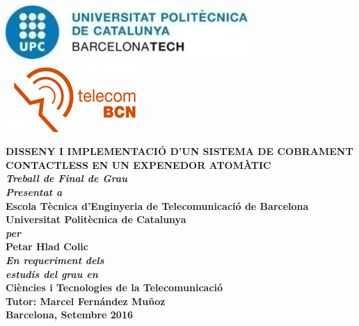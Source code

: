 \documentclass[12pt,a4paper,twoside,openright]{book}
\begin{document}
\newcommand{\titol}{Disseny i implementació d'un sistema de cobrament contactless en un expenedor atomàtic}
\newcommand{\shortitol}{Short title}
\newcommand{\autor}{Petar Hlad Colic}
\renewcommand{\cleardoublepage}{}

\frontmatter
\begin{titlepage}
   	\includegraphics[scale=1]{images/logoUPC.jpg}
   	\hfill
   	\includegraphics[scale=1]{images/logoETSETB.jpg}\\

   	\begin{center}
   	\vspace{1em}
   	\LARGE\textbf{\MakeUppercase{\titol}} \\
   	\vspace{2em}
   	\large\textit{\textbf{Treball de Final de Grau}}\\
   	\large\textit{\textbf{Presentat a}}\\
   	\vspace{0.5em}
   	\Large\textbf{Escola Tècnica d'Enginyeria de Telecomunicació de Barcelona}\\
   	\vspace{0.5em}
   	\Large\textbf{Universitat Politècnica de Catalunya}\\
   	\vspace{1em}
   	\large\textit{\textbf{per}}\\
   	\LARGE\textbf{\autor}\\
   	\vspace{2em}
   	\large\textit{\textbf{En requeriment dels}}\\
   	\large\textit{\textbf{estudis del grau en}}\\
   	\vspace{0.5em}
   	\Large\textbf{Ciències i Tecnologies de la Telecomunicació}\\
   	\vspace{4em}
   	\Large\textbf{Tutor: Marcel Fernández Muñoz}\\
   	\vspace{3em}
   	\large\textbf{Barcelona, Setembre 2016}\\
   	\end{center}
\end{titlepage} 
\newpage{\cleardoublepage}
\end{document}
